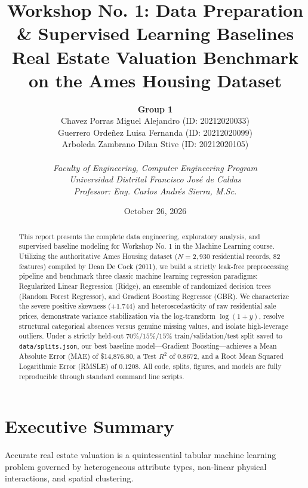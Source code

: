 \documentclass[11pt,a4paper]{article}
\title{\LARGE \textbf{Workshop No. 1: Data Preparation \& Supervised Learning Baselines}\\
\large Real Estate Valuation Benchmark on the Ames Housing Dataset}
\author{
    \textbf{Group 1} \\
    Chavez Porras Miguel Alejandro (ID: 20212020033) \\
    Guerrero Ordeñez Luisa Fernanda (ID: 20212020099) \\
    Arboleda Zambrano Dilan Stive (ID: 20212020105) \\
    \vspace{0.25cm} \\
    \textit{Faculty of Engineering, Computer Engineering Program} \\
    \textit{Universidad Distrital Francisco José de Caldas} \\
    \textit{Professor: Eng. Carlos Andrés Sierra, M.Sc.}
}
\date{October 26, 2026}
\begin{document}
\maketitle

\begin{abstract}
This report presents the complete data engineering, exploratory analysis, and supervised baseline modeling for Workshop No. 1 in the Machine Learning course. Utilizing the authoritative Ames Housing dataset ($N = 2,930$ residential records, 82 features) compiled by Dean De Cock (2011), we build a strictly leak-free preprocessing pipeline and benchmark three classic machine learning regression paradigms: Regularized Linear Regression (Ridge), an ensemble of randomized decision trees (Random Forest Regressor), and Gradient Boosting Regressor (GBR). We characterize the severe positive skewness ($+1.744$) and heteroscedasticity of raw residential sale prices, demonstrate variance stabilization via the log-transform $\log(1 + y)$, resolve structural categorical absences versus genuine missing values, and isolate high-leverage outliers. Under a strictly held-out $70\%/15\%/15\%$ train/validation/test split saved to \texttt{data/splits.json}, our best baseline model—Gradient Boosting—achieves a Mean Absolute Error (MAE) of \$14,876.80, a Test $R^2$ of $0.8672$, and a Root Mean Squared Logarithmic Error (RMSLE) of $0.1208$. All code, splits, figures, and models are fully reproducible through standard command line scripts.
\end{abstract}

\section{Executive Summary}
Accurate real estate valuation is a quintessential tabular machine learning problem governed by heterogeneous attribute types, non-linear physical interactions, and spatial clustering. 
\end{document}
